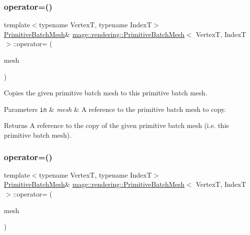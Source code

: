 \subsubsection{\texorpdfstring{operator=()}{operator=()}\hspace{0.1cm}{\footnotesize\ttfamily [1/2]}}
{\footnotesize\ttfamily template$<$typename VertexT, typename IndexT$>$ \\
\hyperlink{classmage_1_1rendering_1_1_primitive_batch_mesh}{Primitive\+Batch\+Mesh}\& \hyperlink{classmage_1_1rendering_1_1_primitive_batch_mesh}{mage\+::rendering\+::\+Primitive\+Batch\+Mesh}$<$ VertexT, IndexT $>$\+::operator= (\begin{DoxyParamCaption}\item[{const \hyperlink{classmage_1_1rendering_1_1_primitive_batch_mesh}{Primitive\+Batch\+Mesh}$<$ VertexT, IndexT $>$ \&}]{mesh }\end{DoxyParamCaption})\hspace{0.3cm}{\ttfamily [delete]}}

Copies the given primitive batch mesh to this primitive batch mesh.


\begin{DoxyParams}[1]{Parameters}
\mbox{\tt in}  & {\em mesh} & A reference to the primitive batch mesh to copy. \\
\hline
\end{DoxyParams}
\begin{DoxyReturn}{Returns}
A reference to the copy of the given primitive batch mesh (i.\+e. this primitive batch mesh). 
\end{DoxyReturn}
\hypertarget{classmage_1_1rendering_1_1_primitive_batch_mesh_a36409f6de1208f30069309675b19feb2}{}\label{classmage_1_1rendering_1_1_primitive_batch_mesh_a36409f6de1208f30069309675b19feb2} 
\subsubsection{\texorpdfstring{operator=()}{operator=()}\hspace{0.1cm}{\footnotesize\ttfamily [2/2]}}
{\footnotesize\ttfamily template$<$typename VertexT, typename IndexT$>$ \\
\hyperlink{classmage_1_1rendering_1_1_primitive_batch_mesh}{Primitive\+Batch\+Mesh}\& \hyperlink{classmage_1_1rendering_1_1_primitive_batch_mesh}{mage\+::rendering\+::\+Primitive\+Batch\+Mesh}$<$ VertexT, IndexT $>$\+::operator= (\begin{DoxyParamCaption}\item[{\hyperlink{classmage_1_1rendering_1_1_primitive_batch_mesh}{Primitive\+Batch\+Mesh}$<$ VertexT, IndexT $>$ \&\&}]{mesh }\end{DoxyParamCaption})\hspace{0.3cm}{\ttfamily [noexcept]}}

